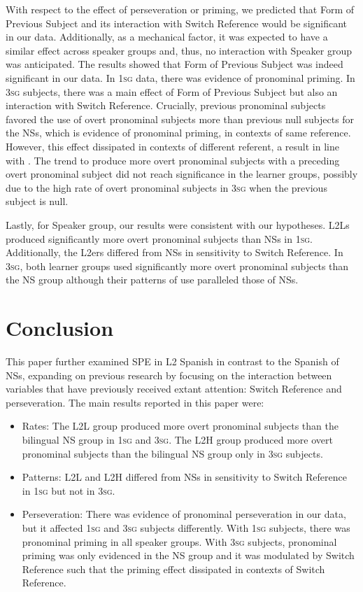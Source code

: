 \documentclass[output=paper,colorlinks,citecolor=brown,draftmode]{langscibook}
\begin{document}
With respect to the effect of perseveration or priming, we predicted that Form of Previous Subject and its interaction with Switch Reference would be significant in our data. Additionally, as a mechanical factor, it was expected to have a similar effect across speaker groups and, thus, no interaction with Speaker group was anticipated. The results showed that Form of Previous Subject was indeed significant in our data. In 1\textsc{sg} data, there was evidence of pronominal priming. In 3\textsc{sg} subjects, there was a main effect of Form of Previous Subject but also an interaction with Switch Reference. Crucially, previous pronominal subjects favored the use of overt pronominal subjects more than previous null subjects for the NSs, which is evidence of pronominal priming, in contexts of same reference. However, this effect dissipated in contexts of different referent, a result in line with \citet{Cameron1994}. The trend to produce more overt pronominal subjects with a preceding overt pronominal subject did not reach significance in the learner groups, possibly due to the high rate of overt pronominal subjects in 3\textsc{sg} when the previous subject is null.

Lastly, for Speaker group, our results were consistent with our hypotheses. L2Ls produced significantly more overt pronominal subjects than NSs in 1\textsc{sg}. Additionally, the L2ers differed from NSs in sensitivity to Switch Reference. In 3\textsc{sg}, both learner groups used significantly more overt pronominal subjects than the NS group although their patterns of use paralleled those of NSs.

\section{Conclusion}

This paper further examined SPE in L2 Spanish in contrast to the Spanish of NSs, expanding on previous research by focusing on the interaction between variables that have previously received extant attention: Switch Reference and perseveration. The main results reported in this paper were:

\begin{itemize}
\item	Rates: The L2L group produced more overt pronominal subjects than the bilingual NS group in 1\textsc{sg} and 3\textsc{sg}. The L2H group produced more overt pronominal subjects than the bilingual NS group only in 3\textsc{sg} subjects.

\item	Patterns: L2L and L2H differed from NSs in sensitivity to Switch Reference in 1\textsc{sg} but not in 3\textsc{sg}.

\item	Perseveration: There was evidence of pronominal perseveration in our data, but it affected 1\textsc{sg} and 3\textsc{sg} subjects differently. With 1\textsc{sg} subjects, there was pronominal priming in all speaker groups. With 3\textsc{sg} subjects, pronominal priming was only evidenced in the NS group and it was modulated by Switch Reference such that the priming effect dissipated in contexts of Switch Reference.
\end{itemize}
\end{document}
